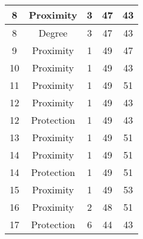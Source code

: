 \documentclass[results.tex]{subfiles}
\begin{document}
\begin{center}
\begin{tabular}{| c || c | c | c | c |}
            \hline
            8                       & Proximity                    & 3                      & 47                      & 43                   \\
            \hline
            8                       & Degree                       & 3                      & 47                      & 43                   \\
            \hline
            9                       & Proximity                    & 1                      & 49                      & 47                   \\
            \hline
            10                      & Proximity                    & 1                      & 49                      & 43                   \\
            \hline
            11                      & Proximity                    & 1                      & 49                      & 51                   \\
            \hline
            12                      & Proximity                    & 1                      & 49                      & 43                   \\
            \hline
            12                      & Protection                   & 1                      & 49                      & 43                   \\
            \hline
            13                      & Proximity                    & 1                      & 49                      & 51                   \\
            \hline
            14                      & Proximity                    & 1                      & 49                      & 51                   \\
            \hline
            14                      & Protection                   & 1                      & 49                      & 51                   \\
            \hline
            15                      & Proximity                    & 1                      & 49                      & 53                   \\
            \hline
            16                      & Proximity                    & 2                      & 48                      & 51                   \\
            \hline
            17                      & Protection                   & 6                      & 44                      & 43                   \\

\end{tabular}
\end{center}
\end{document}
